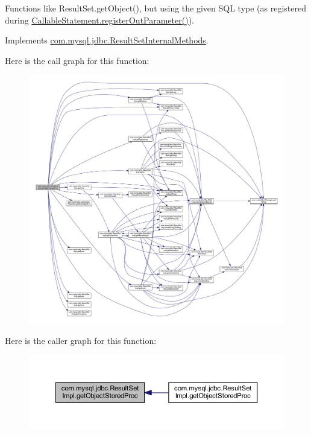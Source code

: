 Functions like Result\+Set.\+get\+Object(), but using the given S\+QL type (as registered during \mbox{\hyperlink{classcom_1_1mysql_1_1jdbc_1_1_callable_statement_a5158af0506cf90040062b2049550f59b}{Callable\+Statement.\+register\+Out\+Parameter()}}). 

Implements \mbox{\hyperlink{interfacecom_1_1mysql_1_1jdbc_1_1_result_set_internal_methods_a817a3b9788bab58dde079d89c4c0d1d9}{com.\+mysql.\+jdbc.\+Result\+Set\+Internal\+Methods}}.

Here is the call graph for this function\+:
\nopagebreak
\begin{figure}[H]
\begin{center}
\leavevmode
\includegraphics[width=350pt]{classcom_1_1mysql_1_1jdbc_1_1_result_set_impl_a028f86af60dacb114ca80d1cc0637d9b_cgraph}
\end{center}
\end{figure}
Here is the caller graph for this function\+:
\nopagebreak
\begin{figure}[H]
\begin{center}
\leavevmode
\includegraphics[width=350pt]{classcom_1_1mysql_1_1jdbc_1_1_result_set_impl_a028f86af60dacb114ca80d1cc0637d9b_icgraph}
\end{center}
\end{figure}
\mbox{\label{classcom_1_1mysql_1_1jdbc_1_1_result_set_impl_a30be3e2e7e3998035613e01d5674aa71}} 
